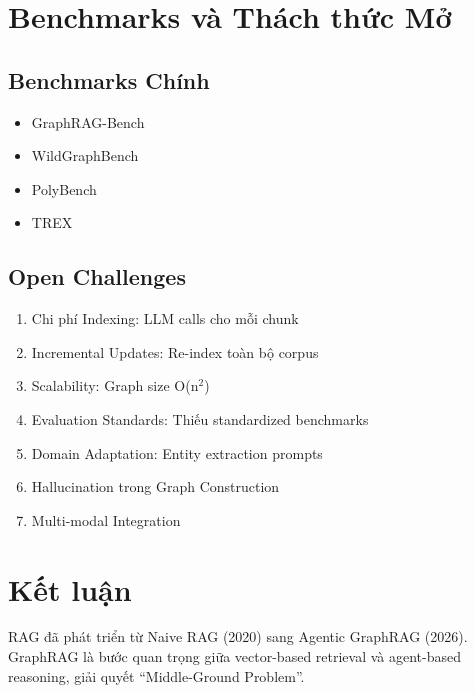 \documentclass[conference]{IEEEtran}
\begin{document}
\section{Benchmarks và Thách thức Mở}

\subsection{Benchmarks Chính}
\begin{itemize}
    \item GraphRAG-Bench \cite{xiang2025whentousegraphs}
    \item WildGraphBench \cite{wang2026wildgraphbench}
    \item PolyBench \cite{liu2025polybench}
    \item TREX \cite{cahoon2025trex}
\end{itemize}

\subsection{Open Challenges}
\begin{enumerate}
    \item Chi phí Indexing: LLM calls cho mỗi chunk
    \item Incremental Updates: Re-index toàn bộ corpus
    \item Scalability: Graph size O(n$^2$)
    \item Evaluation Standards: Thiếu standardized benchmarks
    \item Domain Adaptation: Entity extraction prompts
    \item Hallucination trong Graph Construction
    \item Multi-modal Integration
\end{enumerate}

\section{Kết luận}

RAG đã phát triển từ Naive RAG (2020) sang Agentic GraphRAG (2026). GraphRAG là bước quan trọng giữa vector-based retrieval và agent-based reasoning, giải quyết ``Middle-Ground Problem''.
\end{document}
